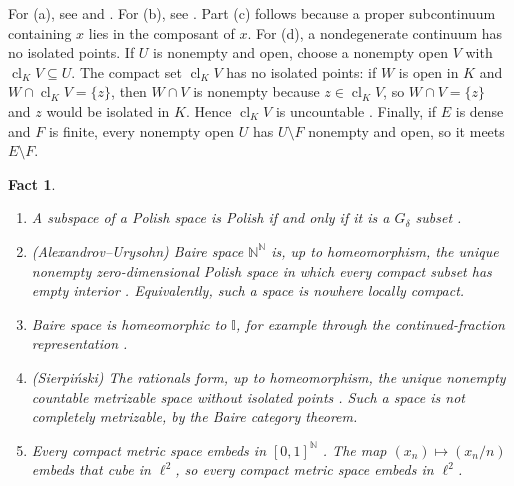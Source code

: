 \documentclass[11pt]{amsart}
\newtheorem{fact}[theorem]{Fact}
\theoremstyle{definition}
\theoremstyle{remark}
\newcommand{\N}{\mathbb{N}}
\newcommand{\I}{\mathbb{I}}
\begin{document}
For (a), see \cite[Chapter~XI]{Na} and \cite[Teorema~1.1.17]{Ra}. For (b), see \cite[5.20(a), 11.15 and 11.17]{Na}. Part (c) follows because a proper subcontinuum containing $x$ lies in the composant of $x$. For (d), a nondegenerate continuum has no isolated points. If $U$ is nonempty and open, choose a nonempty open $V$ with $\operatorname{cl}_KV\subseteq U$. The compact set $\operatorname{cl}_KV$ has no isolated points: if $W$ is open in $K$ and $W\cap\operatorname{cl}_KV=\{z\}$, then $W\cap V$ is nonempty because $z\in\operatorname{cl}_KV$, so $W\cap V=\{z\}$ and $z$ would be isolated in $K$. Hence $\operatorname{cl}_KV$ is uncountable \cite[Section~6]{Ke}. Finally, if $E$ is dense and $F$ is finite, every nonempty open $U$ has $U\setminus F$ nonempty and open, so it meets $E\setminus F$.

\begin{fact}\label{fact:polish}
\begin{enumerate}[label=\textup{(\alph*)}]
\item A subspace of a Polish space is Polish if and only if it is a $G_\delta$ subset \cite[Theorem~3.11]{Ke}.
\item \textup{(Alexandrov--Urysohn)} Baire space $\N^\N$ is, up to homeomorphism, the unique nonempty zero-dimensional Polish space in which every compact subset has empty interior \cite[Theorem~7.7]{Ke}. Equivalently, such a space is nowhere locally compact.
\item Baire space is homeomorphic to $\I$, for example through the continued-fraction representation \cite[Chapter~I]{Ke}.
\item \textup{(Sierpi\'nski)} The rationals form, up to homeomorphism, the unique nonempty countable metrizable space without isolated points \cite[Exercise~7.12]{Ke}. Such a space is not completely metrizable, by the Baire category theorem.
\item Every compact metric space embeds in $[0,1]^\N$ \cite[Theorem~4.14]{Ke}. The map $(x_n)\mapsto(x_n/n)$ embeds that cube in $\ell^2$, so every compact metric space embeds in $\ell^2$.
\end{enumerate}
\end{fact}
\end{document}
